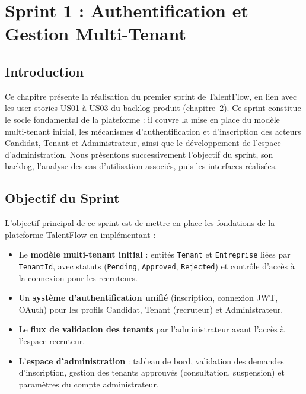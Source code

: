 \chapter{Sprint 1 : Authentification et Gestion Multi-Tenant}

\section*{Introduction}

Ce chapitre présente la réalisation du premier sprint de TalentFlow, en lien avec les
user stories US01 à US03 du backlog produit (chapitre~2). Ce sprint constitue le socle
fondamental de la plateforme : il couvre la mise en place du modèle multi-tenant initial,
les mécanismes d'authentification et d'inscription des acteurs Candidat, Tenant et
Administrateur, ainsi que le développement de l'espace d'administration. Nous présentons
successivement l'objectif du sprint, son backlog, l'analyse des cas d'utilisation associés,
puis les interfaces réalisées.

\section{Objectif du Sprint}

L'objectif principal de ce sprint est de mettre en place les fondations de la plateforme
TalentFlow en implémentant :

\begin{itemize}
    \item Le \textbf{modèle multi-tenant initial} : entités \texttt{Tenant} et
    \texttt{Entreprise} liées par \texttt{TenantId}, avec statuts
    (\texttt{Pending}, \texttt{Approved}, \texttt{Rejected}) et contrôle d'accès à la
    connexion pour les recruteurs.

    \item Un \textbf{système d'authentification unifié} (inscription, connexion JWT,
    OAuth) pour les profils Candidat, Tenant (recruteur) et Administrateur.

    \item Le \textbf{flux de validation des tenants} par l'administrateur avant
    l'accès à l'espace recruteur.

    \item L'\textbf{espace d'administration} : tableau de bord, validation des demandes
    d'inscription, gestion des tenants approuvés (consultation, suspension) et paramètres
    du compte administrateur.
\end{itemize}

